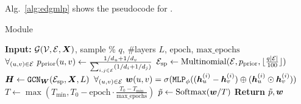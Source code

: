 Alg.~\ref{alg:edgmlp} shows the pseudocode for \edgemlp. 

\begin{algorithm}[!hbt]
\caption{\edgemlp Module}
\begin{algorithmic}[1] %
\small
\STATE \textbf{Input:} ${\mathcal{G}} ({\mathcal{V}}, {\mathcal{E}}, {\bm{X}})$, sample \% $q$, \#layers $L$, $\mathrm{epoch}$,  $\mathrm{max\_epochs}$
\STATE $\forall_{(u,v)\in{\mathcal{E}}}~p_\mathrm{prior}(u,v) \gets \frac{1/d_u + 1/d_v}{\sum_{i,j\in {\mathcal{E}}} (1/d_i + 1/d_j)}$
\STATE ${\mathcal{E}}_\mathrm{sp} \gets \text{Multinomial}({\mathcal{E}}, p_\mathrm{prior}, \lfloor \frac{q|{\mathcal{E}}|}{100} \rfloor)$ %
\STATE ${\bm{H}} \gets \texttt{GCN}_{\bm{W}}({\mathcal{E}}_\mathrm{sp},{\bm{X}}, L)$
\STATE $\forall_{(u,v)\in {\mathcal{E}}}~{\bm{w}}(u,v) = \sigma(\texttt{MLP}_{\phi}(({\bm{h}}^{(i)}_u - {\bm{h}}^{(i)}_v) \oplus ({\bm{h}}^{(i)}_u \odot {\bm{h}}^{(i)}_v))$
\STATE $T \gets \max (T_\mathrm{min},T_0 - \mathrm{epoch} \cdot \frac{T_0 - T_\mathrm{min}}{\mathrm{max}\_\mathrm{epochs}})$
\STATE $\tilde{p} \gets \mathrm{Softmax}({\bm{w}}/T)$    
\STATE \textbf{Return} $\tilde{p}, {\bm{w}}$
\end{algorithmic}
\label{alg:edgmlp}
\end{algorithm}
% 

